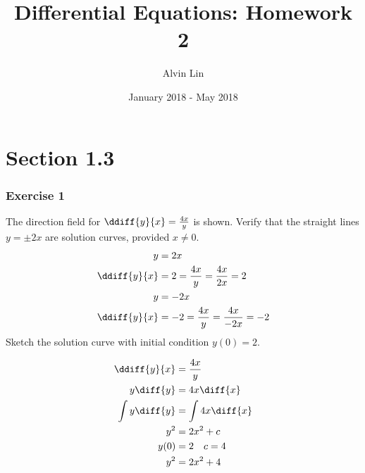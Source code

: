 \documentclass{math}
\title{Differential Equations: Homework 2}
\author{Alvin Lin}
\date{January 2018 - May 2018}
\begin{document}
\maketitle
\clearpage

\section*{Section 1.3}

\subsubsection*{Exercise 1}
The direction field for \( \ddiff{y}{x} = \frac{4x}{y} \) is shown.
Verify that the straight lines \( y = \pm2x \) are solution curves, provided
\( x \ne 0 \).
\begin{align*}
  y &= 2x \\
  \ddiff{y}{x} &= 2 = \frac{4x}{y} = \frac{4x}{2x} = 2 \\
  y &= -2x \\
  \ddiff{y}{x} &= -2 = \frac{4x}{y} = \frac{4x}{-2x} = -2
\end{align*}
Sketch the solution curve with initial condition \( y(0) = 2 \). \\[1cm]
\begin{minipage}[class]{7cm}
  \begin{align*}
    \ddiff{y}{x} &= \frac{4x}{y} \\
    y\diff{y} &= 4x\diff{x} \\
    \int y\diff{y} &= \int 4x\diff{x} \\
    y^2 &= 2x^2+c \\
    y(0) &= 2 \quad c = 4 \\
    y^2 &= 2x^2+4
  \end{align*}
\end{minipage}
\begin{minipage}[c]{8cm}
\end{minipage}
\clearpage
\end{document}
